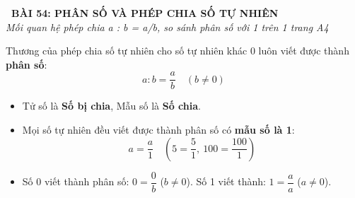 \documentclass[14pt,a4paper,oneside]{extbook}
\begin{document}
\noindent
\begin{tcolorbox}[
  enhanced,
  colback=teal!8!white,
  colframe=teal!80!black,
  arc=3mm, boxrule=1pt,
  left=3mm, right=3mm, top=2mm, bottom=2mm,
  halign=center
]
  {\Large\bfseries\color{teal!90!black}\faBookmark\ BÀI 54: PHÂN SỐ VÀ PHÉP CHIA SỐ TỰ NHIÊN}\\[1.5pt]
  {\footnotesize\itshape\color{black!75} Mối quan hệ phép chia a : b = a/b, so sánh phân số với 1 trên 1 trang A4}
\end{tcolorbox}

\vspace{-2.5mm}

\noindent
\begin{minipage}[t]{0.49\textwidth}\vspace{0pt}
\begin{tcolorbox}[
  enhanced,
  colback=blue!4!white,
  colframe=blue!75!black,
  arc=2mm, boxrule=0.8pt,
  left=2mm, right=2mm, top=1.8mm, bottom=1.8mm,
  title={\footnotesize\bfseries\color{white}\faShareAlt\ 1. Thương của phép chia số tự nhiên}
]
{\footnotesize
Thương của phép chia số tự nhiên cho số tự nhiên khác 0 luôn viết được thành \textbf{phân số}:
$$a : b = \dfrac{a}{b} \quad (b \ne 0)$$
\begin{itemize}\setlength{\itemsep}{1pt}\setlength{\leftskip}{-2.5mm}
  \item Tử số là \textbf{Số bị chia}, Mẫu số là \textbf{Số chia}.
  \item Mọi số tự nhiên đều viết được thành phân số có \textbf{mẫu số là 1}:
  $$a = \dfrac{a}{1} \quad (5 = \dfrac{5}{1},~ 100 = \dfrac{100}{1})$$
  \item Số 0 viết thành phân số: $0 = \dfrac{0}{b}$ ($b \ne 0$). Số 1 viết thành: $1 = \dfrac{a}{a}$ ($a \ne 0$).
\end{itemize}
}
\end{tcolorbox}
\end{minipage}
\hfill
\end{document}
